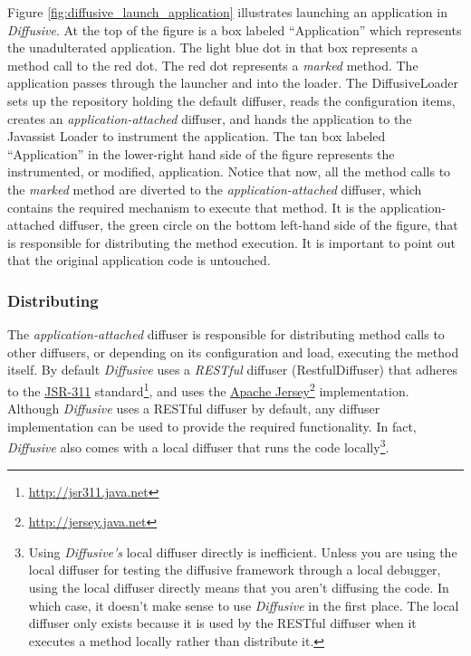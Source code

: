 \documentclass[11pt]{article}
\begin{document}
Figure \ref{fig:diffusive_launch_application} illustrates launching an application in \emph{Diffusive}. At the top of the figure is a box labeled ``Application'' which represents the unadulterated application. The light blue dot in that box represents a method call to the red dot. The red dot represents a \emph{marked} method. The application passes through the launcher and into the loader. The \textsf{DiffusiveLoader} sets up the repository holding the default diffuser, reads the configuration items, creates an \emph{application-attached} diffuser, and hands the application to the Javassist \textsf{Loader} to instrument the application. The tan box labeled ``Application'' in the lower-right hand side of the figure represents the instrumented, or modified, application. Notice that now, all the method calls to the \emph{marked} method are diverted to the \emph{application-attached} diffuser, which contains the required mechanism to execute that method. It is the application-attached diffuser, the green circle on the bottom left-hand side of the figure, that is responsible for distributing the method execution. It is important to point out that the original application code is untouched.

\subsubsection{Distributing\label{sec:distributing}}
The \emph{application-attached} diffuser is responsible for distributing method calls to other diffusers, or depending on its configuration and load, executing the method itself. By default \emph{Diffusive} uses a \emph{RESTful} diffuser (\textsf{RestfulDiffuser}) that adheres to the \href{http://jsr311.java.net}{JSR-311} standard\footnote{\url{http://jsr311.java.net}}, and uses the \href{http://jersey.java.net}{Apache Jersey}\footnote{\url{http://jersey.java.net}} implementation. Although \emph{Diffusive} uses a RESTful diffuser by default, any diffuser implementation can be used to provide the required functionality. In fact, \emph{Diffusive} also comes with a local diffuser that runs the code locally\footnote{Using \emph{Diffusive's} local diffuser directly is inefficient. Unless you are using the local diffuser for testing the diffusive framework through a local debugger, using the local diffuser directly means that you aren't diffusing the code. In which case, it doesn't make sense to use \emph{Diffusive} in the first place. The local diffuser only exists because it is used by the RESTful diffuser when it executes a method locally rather than distribute it.}.
\end{document}
